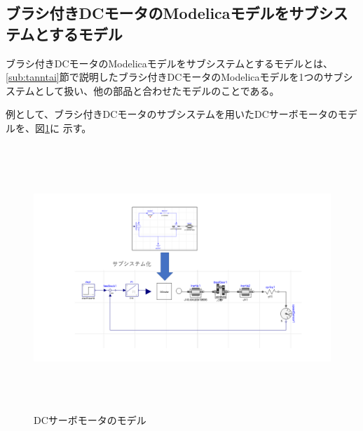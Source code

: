   
\clearpage
% 	



\subsection{ブラシ付きDCモータのModelicaモデルをサブシステムとするモデル} \label{sub:submodel}
ブラシ付きDCモータのModelicaモデルをサブシステムとするモデルとは、
\ref{sub:tanntai}節で説明したブラシ付きDCモータのModelicaモデルを1つのサブシステムとして扱い、他の部品と合わせたモデルのことである。

例として、ブラシ付きDCモータのサブシステムを用いたDCサーボモータのモデルを、図\ref{fig:submodel}に
示す。

\begin{figure}[t]
	\centering
	\includegraphics[width=16.5cm,height=10cm]{./Image/submodel_pack.png}
	\caption{DCサーボモータのモデル}
	\label{fig:submodel}
  \end{figure}

